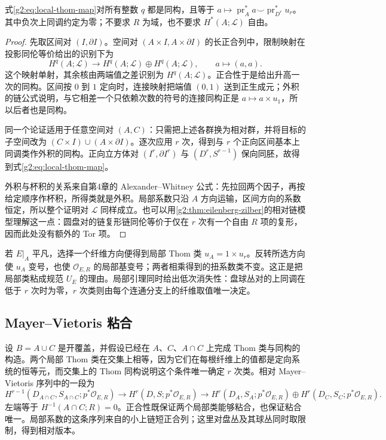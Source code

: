 \begin{lemma}\label{g2:lem:local-thom-isomorphism}
	式\eqref{g2:eq:local-thom-map}对所有整数 \(q\) 都是同构，且等于 \(a\mapsto\operatorname{pr}_A^*a\smile\operatorname{pr}_{D^r}^*u_r\)。其中负次上同调约定为零；不要求 \(R\) 为域，也不要求 \(H^*(A;\mathcal L)\) 自由。
\end{lemma}
\begin{proof}
	先取区间对 \((I,\partial I)\)。空间对 \((A\times I,A\times\partial I)\) 的长正合列中，限制映射在投影同伦等价给出的识别下为
	\[
		H^q(A;\mathcal L)\longrightarrow H^q(A;\mathcal L)\oplus H^q(A;\mathcal L),\qquad a\longmapsto(a,a).
	\]
	这个映射单射，其余核由两端值之差识别为 \(H^q(A;\mathcal L)\)。正合性于是给出升高一次的同构。区间按 \(0\) 到 \(1\) 定向时，连接映射把端值 \((0,1)\) 送到正生成元；外积的链公式说明，与它相差一个只依赖次数的符号的连接同构正是 \(a\mapsto a\times u_1\)，所以后者也是同构。

	同一个论证适用于任意空间对 \((A,C)\)：只需把上述各群换为相对群，并将目标的子空间改为 \((C\times I)\cup(A\times\partial I)\)。逐次应用 \(r\) 次，得到与 \(r\) 个正向区间基本上同调类作外积的同构。正向立方体对 \((I^r,\partial I^r)\) 与 \((D^r,S^{r-1})\) 保向同胚，故得到式\eqref{g2:eq:local-thom-map}。

	外积与杯积的关系来自第4章的 Alexander--Whitney 公式：先拉回两个因子，再按给定顺序作杯积，所得类就是外积。局部系数只沿 \(A\) 方向运输，区间方向的系数恒定，所以整个证明对 \(\mathcal L\) 同样成立。也可以用\cref{g2:thm:eilenberg-zilber}的相对链模型理解这一点：圆盘对的链复形链同伦等价于仅在 \(r\) 次有一个自由 \(R\) 项的复形，因而此处没有额外的 Tor 项。
\end{proof}

若 \(E|_A\) 平凡，选择一个纤维方向便得到局部 Thom 类 \(u_A=1\times u_r\)。反转所选方向使 \(u_A\) 变号，也使 \(\mathcal O_{E,R}\) 的局部基变号；两者相乘得到的扭系数类不变。这正是把局部类粘成规范 \(U_E\) 的理由。局部引理同时给出低次消失性：盘球丛对的上同调在低于 \(r\) 次时为零，\(r\) 次类则由每个连通分支上的纤维取值唯一决定。

\subsection{Mayer–Vietoris 粘合}
\label{g2:subsec:2002:02}
设 \(B=A\cup C\) 是开覆盖，并假设已经在 \(A\)、\(C\)、\(A\cap C\) 上完成 Thom 类与同构的构造。两个局部 Thom 类在交集上相等，因为它们在每根纤维上的值都是定向系统的恒等元，而交集上的 Thom 同构说明这个条件唯一确定 \(r\) 次类。相对 Mayer--Vietoris 序列中的一段为
\[
	H^{r-1}(D_{A\cap C},S_{A\cap C};p^*\mathcal O_{E,R})
	\longrightarrow H^r(D,S;p^*\mathcal O_{E,R})
	\longrightarrow H^r(D_A,S_A;p^*\mathcal O_{E,R})\oplus H^r(D_C,S_C;p^*\mathcal O_{E,R}).
\]
左端等于 \(H^{-1}(A\cap C;R)=0\)。正合性既保证两个局部类能够粘合，也保证粘合唯一。局部系数的这条序列来自的小上链短正合列；这里对盘丛及其球丛同时取限制，得到相对版本。

